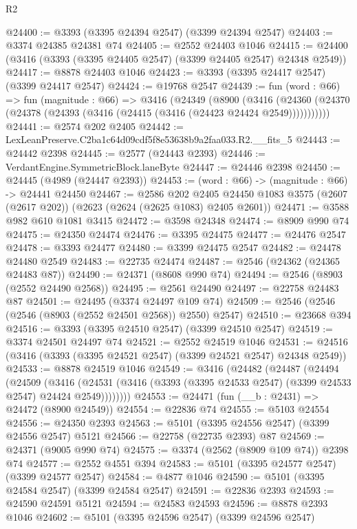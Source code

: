 \begin{lexlean}{R2}
\begin{coremodule}
@24400 := @3393 (@3395 @24394 @2547) (@3399 @24394 @2547)
@24403 := @3374 @24385 @24381 @74
@24405 := @2552 @24403 @1046
@24415 := @24400 (@3416 (@3393 (@3395 @24405 @2547) (@3399 @24405 @2547) @24348 @2549))
@24417 := @8878 @24403 @1046
@24423 := @3393 (@3395 @24417 @2547) (@3399 @24417 @2547)
@24424 := @19768 @2547
@24439 := fun (word : @66) =>
  fun (magnitude : @66) =>
  @3416
    (@24349
      (@8900
        (@3416 (@24360 (@24370 (@24378 (@24393 (@3416 (@24415 (@3416 (@24423 @24424 @2549)))))))))))
@24441 := @2574 @202 @2405
@24442 := LexLeanPreserve.C2ba1c64d09cdf5f8e53638b9a2faa033.R2.__fits_5
@24443 := @24442 @2398
@24445 := @2577 (@24443 @2393)
@24446 := VerdantEngine.SymmetricBlock.laneByte
@24447 := @24446 @2398
@24450 := @24445 (@4989 (@24447 @2393))
@24453 := (word : @66) -> (magnitude : @66) -> @24441 @24450
@24467 := @2586
    @202
    @2405
    @24450
    @1083
    @3575
    (@2607 (@2617 @202))
    (@2623 (@2624 (@2625 @1083) @2405 @2601))
@24471 := @3588 @982 @610 @1081 @3415
@24472 := @3598 @24348
@24474 := @8909 @990 @74
@24475 := @24350 @24474
@24476 := @3395 @24475
@24477 := @24476 @2547
@24478 := @3393 @24477
@24480 := @3399 @24475 @2547
@24482 := @24478 @24480 @2549
@24483 := @22735 @24474
@24487 := @2546 (@24362 (@24365 @24483 @87))
@24490 := @24371 (@8608 @990 @74)
@24494 := @2546 (@8903 (@2552 @24490 @2568))
@24495 := @2561 @24490
@24497 := @22758 @24483 @87
@24501 := @24495 (@3374 @24497 @109 @74)
@24509 := @2546 (@2546 (@2546 (@8903 (@2552 @24501 @2568)) @2550) @2547)
@24510 := @23668 @394
@24516 := @3393 (@3395 @24510 @2547) (@3399 @24510 @2547)
@24519 := @3374 @24501 @24497 @74
@24521 := @2552 @24519 @1046
@24531 := @24516 (@3416 (@3393 (@3395 @24521 @2547) (@3399 @24521 @2547) @24348 @2549))
@24533 := @8878 @24519 @1046
@24549 := @3416
    (@24482
      (@24487
        (@24494
          (@24509
            (@3416
              (@24531 (@3416 (@3393 (@3395 @24533 @2547) (@3399 @24533 @2547) @24424 @2549))))))))
@24553 := @24471 (fun (__b : @2431) => @24472 (@8900 @24549))
@24554 := @22836 @74
@24555 := @5103 @24554
@24556 := @24350 @2393
@24563 := @5101 (@3395 @24556 @2547) (@3399 @24556 @2547) @5121
@24566 := @22758 (@22735 @2393) @87
@24569 := @24371 (@9005 @990 @74)
@24575 := @3374 (@2562 (@8909 @109 @74)) @2398 @74
@24577 := @2552 @4551 @394
@24583 := @5101 (@3395 @24577 @2547) (@3399 @24577 @2547)
@24584 := @4877 @1046
@24590 := @5101 (@3395 @24584 @2547) (@3399 @24584 @2547)
@24591 := @22836 @2393
@24593 := @24590 @24591 @5121
@24594 := @24583 @24593
@24596 := @8878 @2393 @1046
@24602 := @5101 (@3395 @24596 @2547) (@3399 @24596 @2547)

\end{coremodule}
\end{lexlean}
